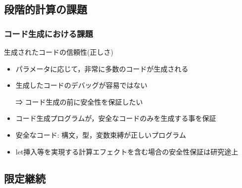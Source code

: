 \documentclass[dvipdfmx,cjk,xcolor=dvipsnames,envcountsect,notheorems,12pt]{beamer}
\theoremstyle{definition}
\begin{document}


\subsection{段階的計算の課題}

\begin{frame}
  \frametitle{コード生成における課題}
  生成されたコードの信頼性(正しさ)
  \begin{itemize}
  \item パラメータに応じて，非常に多数のコードが生成される
  \item 生成したコードのデバッグが容易ではない
  \item [⇒]コード生成の前に安全性を保証したい
  \end{itemize}

  \begin{itemize}
  \item<2-> コード生成プログラムが，安全なコードのみを生成する事を保証
  \item<3-> 安全なコード: 構文，型，変数束縛が正しいプログラム
  \item<4-> \alert{let挿入}等を実現する\alert{計算エフェクトを含む場合の安全性保証は研究途上}
  \end{itemize}
\end{frame}

\subsection{限定継続}
\end{document}
